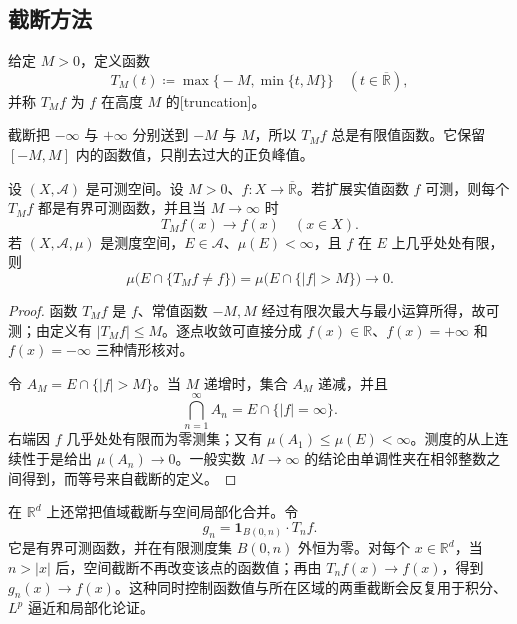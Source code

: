 \subsection{截断方法}
\label{b1:subsec:040304}

\begin{definition}
\label{b1:def:value-truncation}
给定 \(M>0\)，定义函数
\[
T_M(t)\coloneqq\max\bigl\{-M,\min\{t,M\}\bigr\}
\quad(t\in\overline{\mathbb R}),
\]
并称 \(T_Mf\) 为 \(f\) 在高度 \(M\) 的[truncation]。
\end{definition}

截断把 \(-\infty\) 与 \(+\infty\) 分别送到 \(-M\) 与 \(M\)，所以 \(T_Mf\) 总是有限值函数。它保留 \([-M,M]\) 内的函数值，只削去过大的正负峰值。

\begin{proposition}
\label{b1:prop:truncation-properties}
设 \((X,\mathcal A)\) 是可测空间。设 \(M>0\)、\(f:X\to\overline{\mathbb R}\)。若扩展实值函数 \(f\) 可测，则每个 \(T_Mf\) 都是有界可测函数，并且当 \(M\to\infty\) 时
\[
T_Mf(x)\longrightarrow f(x)
\quad(x\in X).
\]
若 \((X,\mathcal A,\mu)\) 是测度空间，\(E\in\mathcal A\)、\(\mu(E)<\infty\)，且 \(f\) 在 \(E\) 上几乎处处有限，则
\[
\mu\bigl(E\cap\{T_Mf\ne f\}\bigr)
=\mu\bigl(E\cap\{|f|>M\}\bigr)
\longrightarrow0.
\]
\end{proposition}
\begin{proof}
函数 \(T_Mf\) 是 \(f\)、常值函数 \(-M,M\) 经过有限次最大与最小运算所得，故可测；由定义有 \(|T_Mf|\leq M\)。逐点收敛可直接分成 \(f(x)\in\mathbb R\)、\(f(x)=+\infty\) 和 \(f(x)=-\infty\) 三种情形核对。

令
\(A_M=E\cap\{|f|>M\}\)。当 \(M\) 递增时，集合 \(A_M\) 递减，并且
\[
\bigcap_{n=1}^{\infty}A_n
=E\cap\{|f|=\infty\}.
\]
右端因 \(f\) 几乎处处有限而为零测集；又有
\(\mu(A_1)\leq\mu(E)<\infty\)。测度的从上连续性于是给出
\(\mu(A_n)\to0\)。一般实数 \(M\to\infty\) 的结论由单调性夹在相邻整数之间得到，而等号来自截断的定义。
\end{proof}

在 \(\mathbb R^d\) 上还常把值域截断与空间局部化合并。令
\[
g_n=\mathbf 1_{B(0,n)}\cdot T_nf.
\]
它是有界可测函数，并在有限测度集 \(B(0,n)\) 外恒为零。对每个 \(x\in\mathbb R^d\)，当 \(n>|x|\) 后，空间截断不再改变该点的函数值；再由 \(T_nf(x)\to f(x)\)，得到 \(g_n(x)\to f(x)\)。这种同时控制函数值与所在区域的两重截断会反复用于积分、\(L^p\) 逼近和局部化论证。
